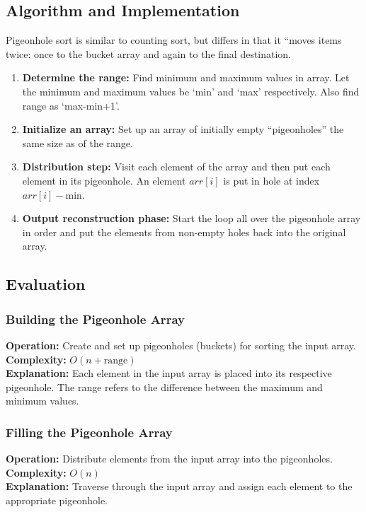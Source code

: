 \subsection{Algorithm and Implementation}

Pigeonhole sort is similar to counting sort, but differs in that it “moves items twice: once to the bucket array and again to the final destination.

\begin{enumerate}
    \item \textbf{Determine the range:} Find minimum and maximum values in array. Let the minimum and maximum values be ‘min’ and ‘max’ respectively. Also find range as ‘max-min+1’.
    \item \textbf{Initialize an array:} Set up an array of initially empty “pigeonholes” the same size as of the range.
    \item \textbf{Distribution step:} Visit each element of the array and then put each element in its pigeonhole. An element $arr[i]$ is put in hole at index $arr[i] - \text{min}$.
    \item \textbf{Output reconstruction phase:} Start the loop all over the pigeonhole array in order and put the elements from non-empty holes back into the original array.
\end{enumerate}



\subsection{Evaluation}

\subsubsection{Building the Pigeonhole Array}
\textbf{Operation:} Create and set up pigeonholes (buckets) for sorting the input array. \\
\textbf{Complexity:} \(O(n + \text{range})\) \\
\textbf{Explanation:} Each element in the input array is placed into its respective pigeonhole. The range refers to the difference between the maximum and minimum values.

\subsubsection{Filling the Pigeonhole Array}
\textbf{Operation:} Distribute elements from the input array into the pigeonholes. \\
\textbf{Complexity:} \(O(n)\) \\
\textbf{Explanation:} Traverse through the input array and assign each element to the appropriate pigeonhole.

